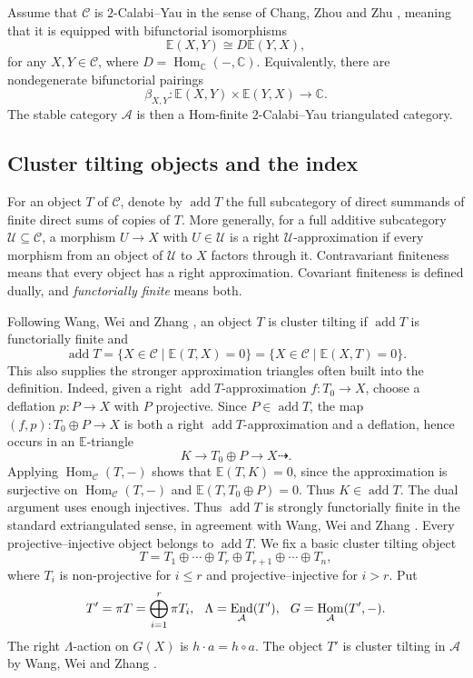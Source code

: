 \documentclass[11pt,reqno]{article}
\numberwithin{equation}{section}
\theoremstyle{definition}
\DeclareMathOperator{\add}{add}
\DeclareMathOperator{\End}{End}
\DeclareMathOperator{\Hom}{Hom}
\newcommand{\C}{\mathcal C}
\newcommand{\A}{\mathcal A}
\newcommand{\E}{\mathbb E}
\newcommand{\kk}{\mathbb C}
\begin{document}
Assume that $\C$ is $2$-Calabi--Yau in the sense of Chang, Zhou and Zhu \cite{CZZ}, meaning that it is equipped with bifunctorial isomorphisms
\begin{equation}\label{eq:2cy}
 \E(X,Y)\cong D\E(Y,X),
 \end{equation}
for any $X,Y\in \C$, where $D=\Hom_{\kk}(-,\kk)$.
Equivalently, there are nondegenerate bifunctorial pairings
\[
 \beta_{X,Y}\colon\E(X,Y)\times\E(Y,X)\longrightarrow\kk.
\]
The stable category $\A$ is then a Hom-finite $2$-Calabi--Yau triangulated category.

\subsection{Cluster tilting objects and the index}
For an object $T$ of $\C$,  denote by $\add T$  the full subcategory of direct summands of finite direct
sums of copies of $T$.  More generally, for a full additive subcategory
$\mathcal U\subseteq\C$, a morphism $U\to X$ with $U\in\mathcal U$ is a right
$\mathcal U$-approximation if every morphism from an object of $\mathcal U$ to
$X$ factors through it.  Contravariant finiteness means that every object has
a right approximation.  Covariant finiteness is defined dually, and
\emph{functorially finite} means both.

Following Wang, Wei and Zhang \cite{WangWeiZhangCC}, an object $T$ is cluster tilting
if $\add T$ is functorially finite and
\[
 \add T
 =\{X\in\C\mid\E(T,X)=0\}
 =\{X\in\C\mid\E(X,T)=0\}.
\]
This also supplies the stronger approximation triangles often built into the
definition.  Indeed, given a right $\add T$-approximation $f\colon T_0\to X$,
choose a deflation $p\colon P\to X$ with $P$ projective.  Since
$P\in\add T$, the map $(f,p)\colon T_0\oplus P\to X$ is both a right
$\add T$-approximation and a deflation, hence occurs in an $\E$-triangle
\[
 K\longrightarrow T_0\oplus P\longrightarrow X\dashrightarrow.
\]
Applying $\Hom_{\C}(T,-)$ shows that $\E(T,K)=0$, since the approximation is surjective on $\Hom_{\C}(T,-)$ and $\E(T,T_0\oplus P)=0$. Thus $K\in\add T$. The dual argument uses enough injectives.  Thus $\add T$ is strongly
functorially finite in the standard extriangulated sense, in agreement with Wang, Wei and Zhang \cite{WangWeiZhangCC}.
Every projective--injective object belongs to $\add T$.  We fix a basic cluster tilting object
\[
 T=T_1\oplus\cdots\oplus T_r\oplus T_{r+1}\oplus\cdots\oplus T_n,
\]
where $T_i$ is non-projective for $i\leq r$ and projective--injective for $i>r$.  Put
\[
 T'=\pi T=\bigoplus_{i=1}^r\pi T_i,
\hspace{2.5mm}
 \Lambda=\End_{\A}(T'),
\hspace{2.5mm}
 G=\Hom_{\A}(T',-).
\]
The right $\Lambda$-action on $G(X)$ is $h\cdot a=h\circ a$. The object $T'$ is cluster tilting in $\A$ by Wang, Wei and Zhang \cite[Lemma~3.1]{WangWeiZhangCC}.
\end{document}
